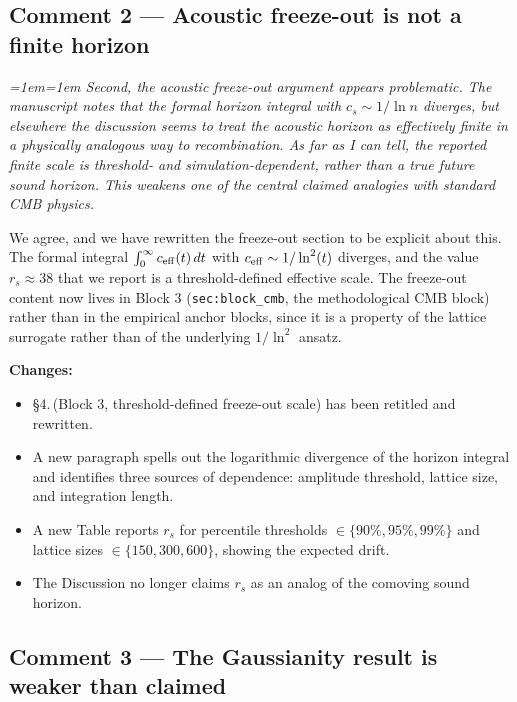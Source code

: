 \documentclass[12pt,a4paper]{article}
\newenvironment{review}{\par\color{revcolor}\itshape\leftskip=1em\rightskip=1em\noindent}{\par}
\begin{document}
\subsection*{Comment 2 --- Acoustic freeze-out is not a finite horizon}

\begin{review}
\textit{Second, the acoustic freeze-out argument appears problematic. The manuscript notes that the formal horizon integral with $c_s \sim 1/\ln n$ diverges, but elsewhere the discussion seems to treat the acoustic horizon as effectively finite in a physically analogous way to recombination. As far as I can tell, the reported finite scale is threshold- and simulation-dependent, rather than a true future sound horizon. This weakens one of the central claimed analogies with standard CMB physics.}
\end{review}

We agree, and we have rewritten the freeze-out section to be explicit about this.
The formal integral $\int_0^\infty c_{\rm eff}(t)\,dt$ with $c_{\rm eff} \sim 1/\ln^2(t)$ diverges, and the value $r_s \approx 38$ that we report is a threshold-defined effective scale.
The freeze-out content now lives in Block 3 (\texttt{sec:block\_cmb}, the methodological CMB block) rather than in the empirical anchor blocks, since it is a property of the lattice surrogate rather than of the underlying $1/\ln^2$ ansatz.

\textbf{Changes:}
\begin{itemize}[leftmargin=2em]
  \item §4.\,(Block 3, threshold-defined freeze-out scale) has been retitled and rewritten.
  \item A new paragraph spells out the logarithmic divergence of the horizon integral and identifies three sources of dependence: amplitude threshold, lattice size, and integration length.
  \item A new Table reports $r_s$ for percentile thresholds $\in \{90\%, 95\%, 99\%\}$ and lattice sizes $\in \{150, 300, 600\}$, showing the expected drift.
  \item The Discussion no longer claims $r_s$ as an analog of the comoving sound horizon.
\end{itemize}

\subsection*{Comment 3 --- The Gaussianity result is weaker than claimed}
\end{document}
